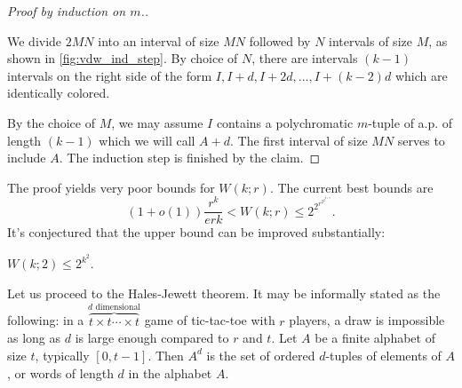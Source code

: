 \begin{proof}[Proof by induction on $m$.]
\begin{figure*}
\begin{center}
\end{center}
\caption{We think of coloring each interval  of size $M$ on the right side into $r$ colors as assigning the entire interval one of $r^M$ colors.}\label{fig:vdw_ind_step}
\end{figure*}
We divide $2MN$ into an interval of size $MN$ followed by $N$ intervals of size $M$, as shown in \cref{fig:vdw_ind_step}.
By choice of $N$, there are intervals $(k-1)$ intervals on the right side of the form $I,I+d,I+2d,\dotsc,I+(k-2)d$  which are identically colored.

By the choice of $M$, we may assume $I$ contains a polychromatic $m$-tuple of a.p. of length $(k-1)$ which we will call $A+d$. The first interval of size $MN$ serves to include $A$. The induction step is finished by the claim.
\end{proof}
The proof yields very poor bounds for $W(k;r)$. The current best bounds are
\[
(1 + o(1)) \frac{r^k}{erk} < W(k;r) \leq 2^{2^{r^{2^{2^{k+9}}}}}.
\]
It's conjectured that the upper bound can be improved substantially:
\begin{conjecture*}
 $W(k;2) \leq 2^{k^2}$.
\end{conjecture*}
Let us proceed to the Hales-Jewett theorem.
 It may be informally stated as the following: in a $\overbrace{t\times t\dotsm \times t}^{d \text{ dimensional}}$ game of tic-tac-toe with $r$ players, a draw is impossible as long as $d$ is large enough compared to $r$ and $t$.
Let $A$ be a finite alphabet of size $t$, typically $[0,t-1]$. 
Then $A^d$ is the set of ordered $d$-tuples of elements of $A$, or words of length $d$ in the alphabet $A$. 

